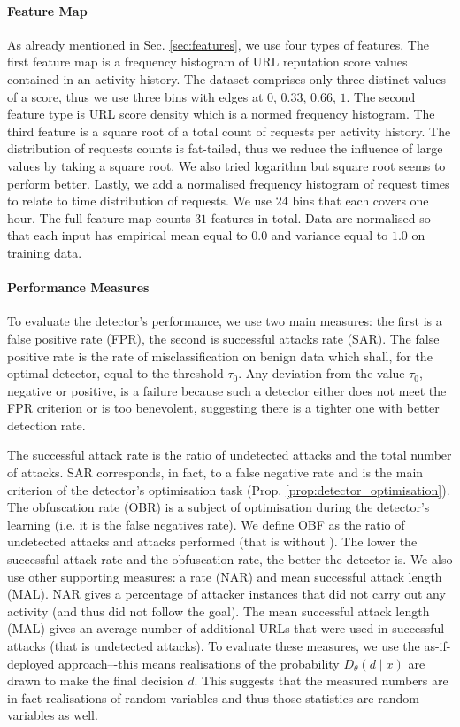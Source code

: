 \paragraph{Feature Map}
As already mentioned in Sec. \ref{sec:features}, we use four types of features. The first feature map is a frequency histogram of URL reputation score values contained in an activity history. The dataset comprises only three distinct values of a score, thus we use three bins with edges at $0$, $0.33$, $0.66$, $1$. The second feature type is URL score density which is a normed frequency histogram. The third feature is a square root of a total count of requests per activity history. The distribution of requests counts is fat-tailed, thus we reduce the influence of large values by taking a square root. We also tried  logarithm but square root seems to perform better. Lastly, we add a normalised frequency histogram of request times to relate to time distribution of requests. We use $24$ bins that each covers one hour. The full feature map counts $31$ features in total. Data are normalised so that each input has empirical mean equal to $0.0$ and variance equal to $1.0$ on training data.

\paragraph{Performance Measures}
To evaluate the detector's performance, we use two main measures: the first is a false positive rate (FPR), the second is successful attacks rate (SAR). The false positive rate is the rate of misclassification on benign data which shall, for the optimal detector, equal to the threshold $\tau_0$. Any deviation from the value $\tau_0$, negative or positive, is a failure because such a detector either does not meet the FPR criterion or is too benevolent, suggesting there is a tighter one with better detection rate.

The successful attack rate is the ratio of undetected attacks and the total number of attacks. SAR corresponds, in fact, to a false negative rate and is the main criterion of the detector's optimisation task (Prop. \ref{prop:detector_optimisation}). The obfuscation rate (OBR) is a subject of optimisation during the detector's learning (i.e. it is the false negatives rate). We define OBF as the ratio of undetected attacks and attacks performed (that is without \NA).
The lower the successful attack rate and the obfuscation rate, the better the detector is.
We also use other supporting measures: a \NA rate (NAR) and mean successful attack length (MAL). NAR gives a percentage of attacker instances that did not carry out any activity (and thus did not follow the goal). The mean successful attack length (MAL) gives an average number of additional URLs that were used in successful attacks (that is undetected attacks). To evaluate these measures, we use the as-if-deployed approach–-this means realisations of the probability $D_\theta(d \mid x)$ are drawn to make the final decision $d$. This suggests that the measured numbers are in fact realisations of random variables and thus those statistics are random variables as well.

